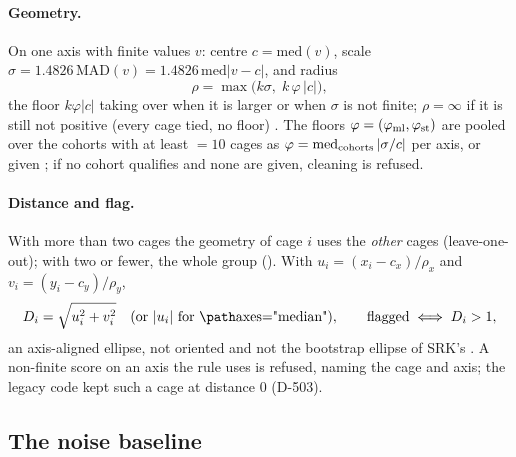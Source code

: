 \paragraph{Geometry.} On one axis with finite values $v$: centre $c=\mathrm{med}(v)$, scale
$\sigma=1.4826\,\mathrm{MAD}(v)=1.4826\,\mathrm{med}|v-c|$, and radius
\begin{equation}\label{eq:clean-radius}
  \rho=\max\big(k\sigma,\;k\,\varphi\,|c|\big),
\end{equation}
the floor $k\varphi|c|$ taking over when it is larger or when $\sigma$ is not finite; $\rho=\infty$ if it is still not
positive (every cage tied, no floor) . The floors $\varphi=(\varphi_{\rm ml},
\varphi_{\rm st})$ are pooled over the cohorts with at least $=10$ cages as
$\varphi=\mathrm{med}_{\rm cohorts}\,|\sigma/c|$ per axis, or given ; if no cohort
qualifies and none are given, cleaning is refused.

\paragraph{Distance and flag.} With more than two cages the geometry of cage $i$ uses the \emph{other} cages
(leave-one-out); with two or fewer, the whole group (). With $u_i=(x_i-c_x)/\rho_x$ and
$v_i=(y_i-c_y)/\rho_y$,
\begin{equation}\label{eq:clean-dist}
  D_i=\sqrt{u_i^2+v_i^2}\quad(\text{or }|u_i|\text{ for }\code{axes="median"}),\qquad
  \text{flagged}\iff D_i>1,
\end{equation}
an axis-aligned ellipse, not oriented and not the bootstrap ellipse of SRK's 
. A non-finite score on an axis the rule uses is refused, naming
the cage and axis; the legacy code kept such a cage at distance 0 (D-503).

\subsection{The noise baseline}\label{sec:clean-noise}

